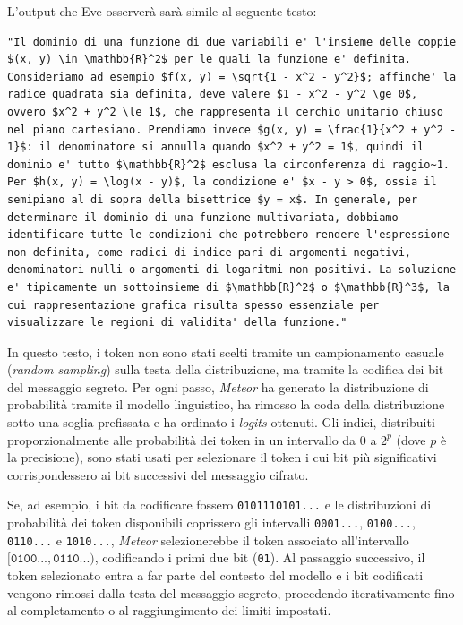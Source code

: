 L'output che Eve osserverà sarà simile al seguente testo:
\begin{lstlisting}[caption={Esempio di testo generato da Meteor contenente un messaggio cifrato. Il messaggio è in formato Markdown, il principale stile di formattazione degli LLM moderni.}, captionpos=b, label={lst:meteor-output-example}]
"Il dominio di una funzione di due variabili e' l'insieme delle coppie $(x, y) \in \mathbb{R}^2$ per le quali la funzione e' definita. Consideriamo ad esempio $f(x, y) = \sqrt{1 - x^2 - y^2}$; affinche' la radice quadrata sia definita, deve valere $1 - x^2 - y^2 \ge 0$, ovvero $x^2 + y^2 \le 1$, che rappresenta il cerchio unitario chiuso nel piano cartesiano. Prendiamo invece $g(x, y) = \frac{1}{x^2 + y^2 - 1}$: il denominatore si annulla quando $x^2 + y^2 = 1$, quindi il dominio e' tutto $\mathbb{R}^2$ esclusa la circonferenza di raggio~1. Per $h(x, y) = \log(x - y)$, la condizione e' $x - y > 0$, ossia il semipiano al di sopra della bisettrice $y = x$. In generale, per determinare il dominio di una funzione multivariata, dobbiamo identificare tutte le condizioni che potrebbero rendere l'espressione non definita, come radici di indice pari di argomenti negativi, denominatori nulli o argomenti di logaritmi non positivi. La soluzione e' tipicamente un sottoinsieme di $\mathbb{R}^2$ o $\mathbb{R}^3$, la cui rappresentazione grafica risulta spesso essenziale per visualizzare le regioni di validita' della funzione."
\end{lstlisting}

In questo testo, i token non sono stati scelti tramite un campionamento casuale (\emph{random sampling}) sulla testa della distribuzione, ma tramite la codifica dei bit del messaggio segreto. Per ogni passo, \emph{Meteor} ha generato la distribuzione di probabilità tramite il modello linguistico, ha rimosso la coda della distribuzione sotto una soglia prefissata e ha ordinato i \emph{logits} ottenuti. Gli indici, distribuiti proporzionalmente alle probabilità dei token in un intervallo da $0$ a $2^p$ (dove $p$ è la precisione), sono stati usati per selezionare il token i cui bit più significativi corrispondessero ai bit successivi del messaggio cifrato.

Se, ad esempio, i bit da codificare fossero \texttt{0101110101...} e le distribuzioni di probabilità dei token disponibili coprissero gli intervalli \texttt{0001...}, \texttt{0100...}, \texttt{0110...} e \texttt{1010...}, \emph{Meteor} selezionerebbe il token associato all'intervallo $[\texttt{0100...}, \texttt{0110...})$, codificando i primi due bit (\texttt{01}). Al passaggio successivo, il token selezionato entra a far parte del contesto del modello e i bit codificati vengono rimossi dalla testa del messaggio segreto, procedendo iterativamente fino al completamento o al raggiungimento dei limiti impostati.

